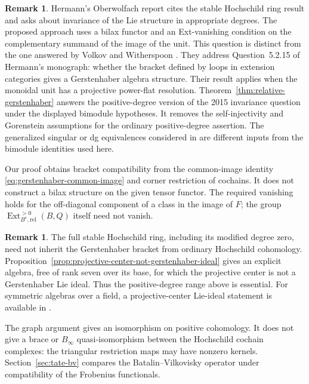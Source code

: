 \documentclass[12pt,a4paper,english,reqno]{amsart}
\numberwithin{equation}{section}
\theoremstyle{plain}
\theoremstyle{definition}
\newtheorem{remark}[theorem]{Remark}
\begin{document}
\begin{remark}
Hermann's Oberwolfach report \cite[Section~4, pp.~1363--1364]
{Hermann2015Oberwolfach} cites the stable Hochschild ring result and
asks about invariance of the Lie structure in appropriate degrees.
The proposed approach uses a bilax functor and an Ext-vanishing
condition on the complementary summand of the image of the unit.
This question is distinct from the one answered by Volkov and
Witherspoon \cite{VolkovWitherspoon2024}.  They address
Question~5.2.15 of Hermann's monograph: whether the bracket defined
by loops in extension categories gives a Gerstenhaber algebra
structure.  Their result applies when the monoidal unit has a
projective power-flat resolution.
Theorem~\ref{thm:relative-gerstenhaber} answers the positive-degree
version of the 2015 invariance question under the displayed
bimodule hypotheses.  It removes the self-injectivity and
Gorenstein assumptions for the ordinary positive-degree assertion.
The generalized singular or dg equivalences considered in
\cite{BriggsRubio2022,Wang2021Gerstenhaber} are different inputs
from the bimodule identities used here.

Our proof obtains bracket compatibility from the common-image
identity \eqref{eq:gerstenhaber-common-image} and corner restriction
of cochains.  It does not construct a bilax structure on the given
tensor functor.  The required vanishing holds for the off-diagonal
component of a class in the image of $F$; the group
$\operatorname{Ext}_{B^e,\mathrm{rel}}^{>0}(B,Q)$ itself need not vanish.
\end{remark}

\begin{remark}
The full stable Hochschild ring, including its modified degree zero,
need not inherit the Gerstenhaber bracket from ordinary Hochschild
cohomology.  Proposition~\ref{prop:projective-center-not-gerstenhaber-ideal}
gives an explicit algebra, free of rank seven over its base, for
which the projective center is not a Gerstenhaber Lie ideal.  Thus
the positive-degree range above is essential.  For symmetric
algebras over a field, a projective-center Lie-ideal statement is available in
\cite[Lemma~10.6]{KoenigLiuZhou2012}.

The graph argument gives an isomorphism on positive cohomology.
It does not give a brace or $B_\infty$ quasi-isomorphism between
the Hochschild cochain complexes: the triangular restriction maps
may have nonzero kernels. Section~\ref{sec:tate-bv} compares
the Batalin--Vilkovisky operator under compatibility of the
Frobenius functionals.
\end{remark}
\end{document}
